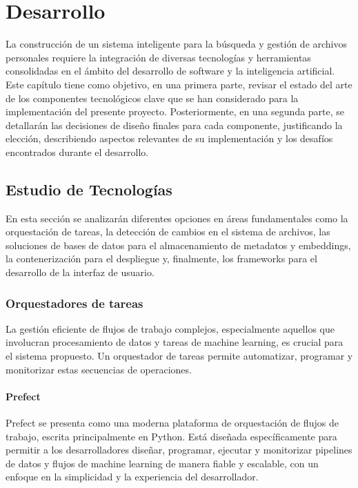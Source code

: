 
\chapter{Desarrollo}
\label{desarrollo}

La construcción de un sistema inteligente para la búsqueda y gestión de archivos personales requiere la integración de diversas tecnologías y herramientas consolidadas en el ámbito del desarrollo de software y la inteligencia artificial. Este capítulo tiene como objetivo, en una primera parte, revisar el estado del arte de los componentes tecnológicos clave que se han considerado para la implementación del presente proyecto. Posteriormente, en una segunda parte, se detallarán las decisiones de diseño finales para cada componente, justificando la elección, describiendo aspectos relevantes de su implementación y los desafíos encontrados durante el desarrollo.

\section{Estudio de Tecnologías}
\label{sec:estudio_tecnologias}
En esta sección se analizarán diferentes opciones en áreas fundamentales como la orquestación de tareas, la detección de cambios en el sistema de archivos, las soluciones de bases de datos para el almacenamiento de metadatos y embeddings, la contenerización para el despliegue y, finalmente, los frameworks para el desarrollo de la interfaz de usuario.

\subsection{Orquestadores de tareas}
La gestión eficiente de flujos de trabajo complejos, especialmente aquellos que involucran procesamiento de datos y tareas de machine learning, es crucial para el sistema propuesto. Un orquestador de tareas permite automatizar, programar y monitorizar estas secuencias de operaciones.

\subsubsection{Prefect}
Prefect se presenta como una moderna plataforma de orquestación de flujos de trabajo, escrita principalmente en Python. Está diseñada específicamente para permitir a los desarrolladores diseñar, programar, ejecutar y monitorizar pipelines de datos y flujos de machine learning de manera fiable y escalable, con un enfoque en la simplicidad y la experiencia del desarrollador.

